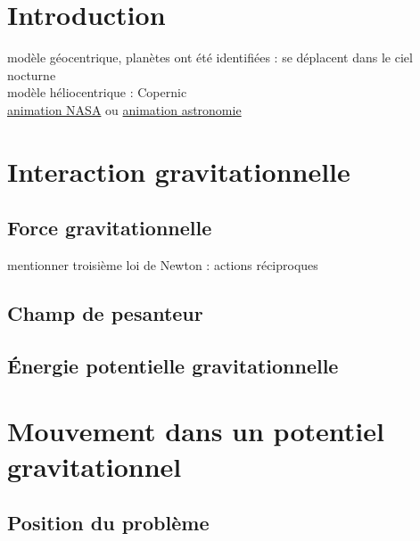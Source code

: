 


\biblio{}


\section*{Introduction}
modèle géocentrique, planètes ont été identifiées : se déplacent dans le ciel nocturne \\
modèle héliocentrique : Copernic \\
\href{https://solarsystem.nasa.gov/solar-system/our-solar-system/overview/}{animation NASA}
ou
\href{http://www.planete-astronomie.com/animation-de-la-position-des-planetes.html}{animation astronomie}




\section{Interaction gravitationnelle}
\subsection{Force gravitationnelle}
mentionner troisième loi de Newton : actions réciproques
\subsection{Champ de pesanteur}
\subsection{Énergie potentielle gravitationnelle}
\section{Mouvement dans un potentiel gravitationnel}
\subsection{Position du problème}
